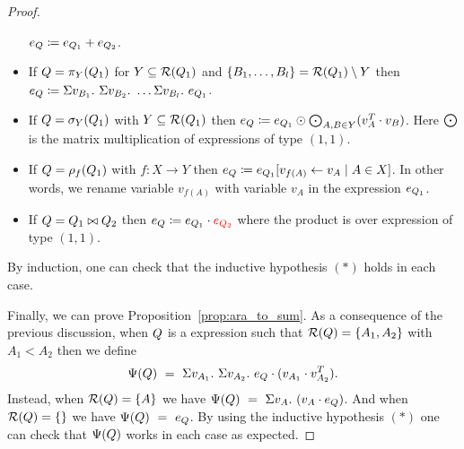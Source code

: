 \begin{proof}
\begin{itemize}
	$e_{Q}\coloneqq e_{Q_1} + e_{Q_2}$.
	\item If $Q=\pi_{Y}(Q_1)$ for $Y\subseteq \mathcal{R}(Q_1)$ and $\{B_1, \ldots, B_l\} = \mathcal{R}(Q_1) \setminus Y$ then
	$
	e_{Q}\coloneqq  \Sigma v_{B_1}. \ \Sigma v_{B_2}. \ \ldots \Sigma v_{B_l}. \ e_{Q_1}
	$.
	\item If $Q=\sigma_{Y}(Q_1)$ with $Y\subseteq\mathcal{R}(Q_1)$ then
	$
	e_{Q}\coloneqq e_{Q_1} \odot \bigodot_{A,B\in Y} (v_{A}^T \cdot v_{B})
	$.
	Here $\bigodot$ is the matrix multiplication of expressions of type $(1,1)$.
	\item If $Q=\rho_{f}(Q_1)$ with $f: X \rightarrow Y$ then
	$e_{Q}\coloneqq e_{Q_1}[v_{f(A)} \gets v_A\mid A\in X]$.
	In other words, we rename variable $v_{f(A)}$ with variable $v_A$ in the expression $e_{Q_1}$. 
	\item If $Q=Q_1\bowtie Q_2$ then
	$e_{Q}\coloneqq e_{Q_1} \cdot {\color{red} e_{Q_2}}$ where the product is over expression of type $(1,1)$.
\end{itemize}
By induction, one can check that the inductive hypothesis $(*)$ holds in each case. 

Finally, we can prove Proposition~\ref{prop:ara_to_sum}.
As a consequence of the previous discussion, when $Q$ is a \rak expression 
such that $\mathcal{R}(Q)=\{A_1,A_2\}$ with $A_1<A_2$ then we define
$$
\Psi(Q) \ = \ \Sigma v_{A_1}. \ \Sigma v_{A_2}. \ e_{Q} \cdot (v_{A_1} \cdot v_{A_2}^T). 
$$
Instead, when $\mathcal{R}(Q)=\{A\}$ we have $
\Psi(Q) \ = \ \Sigma v_{A}. \  (v_{A} \cdot e_{Q})$.
And when $\mathcal{R}(Q)=\{\}$ we have $
\Psi(Q) \ = \ e_{Q}
$.
By using the inductive hypothesis $(*)$ one can check that $\Psi(Q)$ works in each case as expected. 
\end{proof}
 
